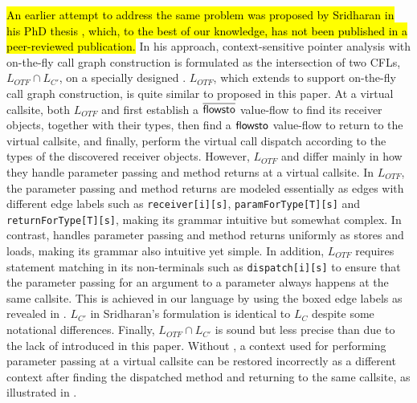\hl{An earlier attempt to address the same problem was proposed by Sridharan in his PhD thesis \cite{sridharan2007refinement}, which, to the best of our knowledge, has not been published in a peer-reviewed publication.}
In his approach, context-sensitive pointer analysis with on-the-fly call graph construction is formulated as the intersection of two CFLs,  $L_{OTF} \cap L_{C'}$, on a specially designed \pag. $L_{OTF}$, which extends \manuLF to support on-the-fly call graph construction, is quite similar to \LF
proposed in this paper. At a virtual callsite, both $L_{OTF}$ and \LF first establish
a $\overline{\textsf{flowsto}}$ value-flow to find its receiver objects, together with  their types, then find a $\textsf{flowsto}$ value-flow to return to the virtual callsite, and finally, perform the virtual call dispatch according to the types of the discovered receiver objects. However,   $L_{OTF}$ and \LF differ mainly in how they handle parameter passing and method returns at a virtual callsite. In $L_{OTF}$, the parameter passing and 
method returns are modeled essentially as \assign edges with different edge labels such as \texttt{receiver[i][s]}, \texttt{paramForType[T][s]} and \texttt{returnForType[T][s]}, making its grammar  intuitive but somewhat complex. In contrast, \LF handles parameter passing and method returns uniformly as  stores and loads, making its grammar also intuitive yet simple. In addition, $L_{OTF}$ requires statement matching in its non-terminals such as \texttt{dispatch[i][s]} to ensure 
that the parameter passing for an argument to a parameter always happens at the same callsite. This is achieved in our \LR language by using the boxed edge labels
as revealed in . 
$L_{C'}$ in Sridharan's formulation is identical to $L_C$ despite some notational differences. Finally, $L_{OTF} \cap L_{C'}$ is sound but less precise than \LFCR due to the lack of \LR introduced in this paper. Without \LR, a context used for
 performing parameter passing at a virtual callsite can be restored
 incorrectly as a different context after finding the dispatched method and returning to the same  callsite, as illustrated in .

